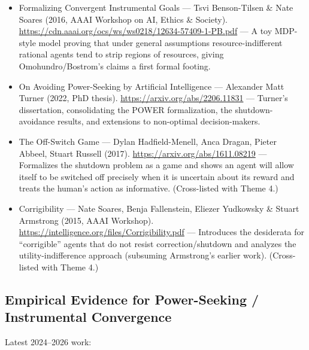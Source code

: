 \documentclass[11pt]{article}
\begin{document}
\begin{itemize}
  \item Formalizing Convergent Instrumental Goals --- Tsvi Benson-Tilsen \& Nate Soares (2016, AAAI Workshop on AI, Ethics \& Society). \href{https://cdn.aaai.org/ocs/ws/ws0218/12634-57409-1-PB.pdf}{https://cdn.aaai.org/ocs/ws/ws0218/12634-57409-1-PB.pdf} --- A toy MDP-style model proving that under general assumptions resource-indifferent rational agents tend to strip regions of resources, giving Omohundro/Bostrom's claims a first formal footing.
  \item On Avoiding Power-Seeking by Artificial Intelligence --- Alexander Matt Turner (2022, PhD thesis). \href{https://arxiv.org/abs/2206.11831}{https://arxiv.org/abs/2206.11831} --- Turner's dissertation, consolidating the POWER formalization, the shutdown-avoidance results, and extensions to non-optimal decision-makers.
  \item The Off-Switch Game --- Dylan Hadfield-Menell, Anca Dragan, Pieter Abbeel, Stuart Russell (2017). \href{https://arxiv.org/abs/1611.08219}{https://arxiv.org/abs/1611.08219} --- Formalizes the shutdown problem as a game and shows an agent will allow itself to be switched off precisely when it is uncertain about its reward and treats the human's action as informative. (Cross-listed with Theme 4.)
  \item Corrigibility --- Nate Soares, Benja Fallenstein, Eliezer Yudkowsky \& Stuart Armstrong (2015, AAAI Workshop). \href{https://intelligence.org/files/Corrigibility.pdf}{https://intelligence.org/files/Corrigibility.pdf} --- Introduces the desiderata for ``corrigible'' agents that do not resist correction/shutdown and analyzes the utility-indifference approach (subsuming Armstrong's earlier work). (Cross-listed with Theme 4.)
\end{itemize}

\subsection*{Empirical Evidence for Power-Seeking / Instrumental Convergence}

Latest 2024--2026 work:
\end{document}

